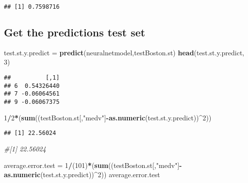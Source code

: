 \documentclass[
]{book}
\newenvironment{Shaded}{\begin{snugshade}}{\end{snugshade}}
\newcommand{\CommentTok}[1]{\textcolor[rgb]{0.56,0.35,0.01}{\textit{#1}}}
\newcommand{\DecValTok}[1]{\textcolor[rgb]{0.00,0.00,0.81}{#1}}
\newcommand{\KeywordTok}[1]{\textcolor[rgb]{0.13,0.29,0.53}{\textbf{#1}}}
\newcommand{\NormalTok}[1]{#1}
\newcommand{\OperatorTok}[1]{\textcolor[rgb]{0.81,0.36,0.00}{\textbf{#1}}}
\newcommand{\StringTok}[1]{\textcolor[rgb]{0.31,0.60,0.02}{#1}}
\begin{document}
\begin{verbatim}
## [1] 0.7598716
\end{verbatim}

\hypertarget{get-the-predictions-test-set}{%
\subsection{Get the predictions test set}\label{get-the-predictions-test-set}}

\begin{Shaded}
\begin{Highlighting}[]
\NormalTok{test.st.y.predict =}\StringTok{ }\KeywordTok{predict}\NormalTok{(neuralnetmodel,testBoston.st)}
\KeywordTok{head}\NormalTok{(test.st.y.predict, }\DecValTok{3}\NormalTok{)}
\end{Highlighting}
\end{Shaded}

\begin{verbatim}
##          [,1]
## 6  0.54326440
## 7 -0.06064561
## 9 -0.06067375
\end{verbatim}

\begin{Shaded}
\begin{Highlighting}[]
\DecValTok{1}\OperatorTok{/}\DecValTok{2}\OperatorTok{*}\NormalTok{(}\KeywordTok{sum}\NormalTok{((testBoston.st[,}\StringTok{"medv"}\NormalTok{]}\OperatorTok{-}\KeywordTok{as.numeric}\NormalTok{(test.st.y.predict))}\OperatorTok{^}\DecValTok{2}\NormalTok{))}
\end{Highlighting}
\end{Shaded}

\begin{verbatim}
## [1] 22.56024
\end{verbatim}

\begin{Shaded}
\begin{Highlighting}[]
\CommentTok{#[1] 22.56024}
\end{Highlighting}
\end{Shaded}

\begin{Shaded}
\begin{Highlighting}[]
\NormalTok{average.error.test =}\StringTok{ }\DecValTok{1}\OperatorTok{/}\NormalTok{(}\DecValTok{101}\NormalTok{)}\OperatorTok{*}\NormalTok{(}\KeywordTok{sum}\NormalTok{((testBoston.st[,}\StringTok{"medv"}\NormalTok{]}\OperatorTok{-}\KeywordTok{as.numeric}\NormalTok{(test.st.y.predict))}\OperatorTok{^}\DecValTok{2}\NormalTok{))}
\NormalTok{average.error.test}
\end{Highlighting}
\end{Shaded}
\end{document}
